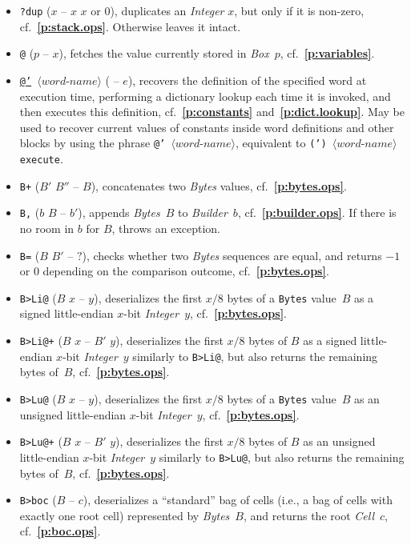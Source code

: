 \documentclass[12pt,oneside]{article}
\def\refpoint#1{{\rm\textbf{\ref{#1}}}}
\let\ptref=\refpoint
\begin{document}
\begin{itemize}
\item {\tt ?dup} ($x$ -- $x$ $x$ or $0$), duplicates an {\em Integer\/} $x$, but only if it is non-zero, cf.~\ptref{p:stack.ops}. Otherwise leaves it intact.
\item {\tt @} ($p$ -- $x$), fetches the value currently stored in {\em Box\/}~$p$, cf.~\ptref{p:variables}.
\item {\tt \underline{@'} $\langle\textit{word-name}\rangle$} ( -- $e$), recovers the definition of the specified word at execution time, performing a dictionary lookup each time it is invoked, and then executes this definition, cf.~\ptref{p:constants} and~\ptref{p:dict.lookup}. May be used to recover current values of constants inside word definitions and other blocks by using the phrase {\tt @' $\langle\textit{word-name}\rangle$}, equivalent to {\tt (') $\langle\textit{word-name}\rangle$ execute}.
\item {\tt B+} ($B'$ $B''$ -- $B$), concatenates two {\em Bytes\/} values, cf.~\ptref{p:bytes.ops}.
\item {\tt B,} ($b$ $B$ -- $b'$), appends {\em Bytes\/}~$B$ to {\em Builder\/}~$b$, cf.~\ptref{p:builder.ops}. If there is no room in $b$ for $B$, throws an exception.
\item {\tt B=} ($B$ $B'$ -- $?$), checks whether two {\em Bytes\/} sequences are equal, and returns $-1$ or $0$ depending on the comparison outcome, cf.~\ptref{p:bytes.ops}.
\item {\tt B>Li@} ($B$ $x$ -- $y$), deserializes the first $x/8$ bytes of a {\tt Bytes} value~$B$ as a signed little-endian $x$-bit {\em Integer}~$y$, cf.~\ptref{p:bytes.ops}.
\item {\tt B>Li@+} ($B$ $x$ -- $B'$ $y$), deserializes the first $x/8$ bytes of $B$ as a signed little-endian $x$-bit {\em Integer}~$y$ similarly to {\tt B>Li@}, but also returns the remaining bytes of~$B$, cf.~\ptref{p:bytes.ops}.
\item {\tt B>Lu@} ($B$ $x$ -- $y$), deserializes the first $x/8$ bytes of a {\tt Bytes} value~$B$ as an unsigned little-endian $x$-bit {\em Integer}~$y$, cf.~\ptref{p:bytes.ops}.
\item {\tt B>Lu@+} ($B$ $x$ -- $B'$ $y$), deserializes the first $x/8$ bytes of $B$ as an unsigned little-endian $x$-bit {\em Integer}~$y$ similarly to {\tt B>Lu@}, but also returns the remaining bytes of~$B$, cf.~\ptref{p:bytes.ops}.
\item {\tt B>boc} ($B$ -- $c$), deserializes a ``standard'' bag of cells (i.e., a bag of cells with exactly one root cell) represented by {\em Bytes\/}~$B$, and returns the root {\em Cell\/}~$c$, cf.~\ptref{p:boc.ops}.

\end{itemize}
\end{document}
